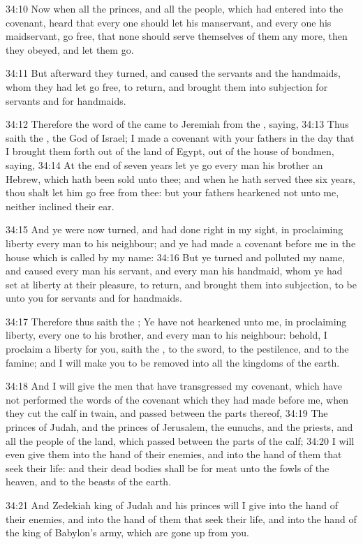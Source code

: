 34:10 Now when all the princes, and all the people, which had entered into the covenant, heard that every one should let his manservant, and every one his maidservant, go free, that none should serve themselves of them any more, then they obeyed, and let them go.

34:11 But afterward they turned, and caused the servants and the handmaids, whom they had let go free, to return, and brought them into subjection for servants and for handmaids.

34:12 Therefore the word of the \LORD came to Jeremiah from the \LORD, saying, 34:13 Thus saith the \LORD, the God of Israel; I made a covenant with your fathers in the day that I brought them forth out of the land of Egypt, out of the house of bondmen, saying, 34:14 At the end of seven years let ye go every man his brother an Hebrew, which hath been sold unto thee; and when he hath served thee six years, thou shalt let him go free from thee: but your fathers hearkened not unto me, neither inclined their ear.

34:15 And ye were now turned, and had done right in my sight, in proclaiming liberty every man to his neighbour; and ye had made a covenant before me in the house which is called by my name: 34:16 But ye turned and polluted my name, and caused every man his servant, and every man his handmaid, whom ye had set at liberty at their pleasure, to return, and brought them into subjection, to be unto you for servants and for handmaids.

34:17 Therefore thus saith the \LORD; Ye have not hearkened unto me, in proclaiming liberty, every one to his brother, and every man to his neighbour: behold, I proclaim a liberty for you, saith the \LORD, to the sword, to the pestilence, and to the famine; and I will make you to be removed into all the kingdoms of the earth.

34:18 And I will give the men that have transgressed my covenant, which have not performed the words of the covenant which they had made before me, when they cut the calf in twain, and passed between the parts thereof, 34:19 The princes of Judah, and the princes of Jerusalem, the eunuchs, and the priests, and all the people of the land, which passed between the parts of the calf; 34:20 I will even give them into the hand of their enemies, and into the hand of them that seek their life: and their dead bodies shall be for meat unto the fowls of the heaven, and to the beasts of the earth.

34:21 And Zedekiah king of Judah and his princes will I give into the hand of their enemies, and into the hand of them that seek their life, and into the hand of the king of Babylon's army, which are gone up from you.

